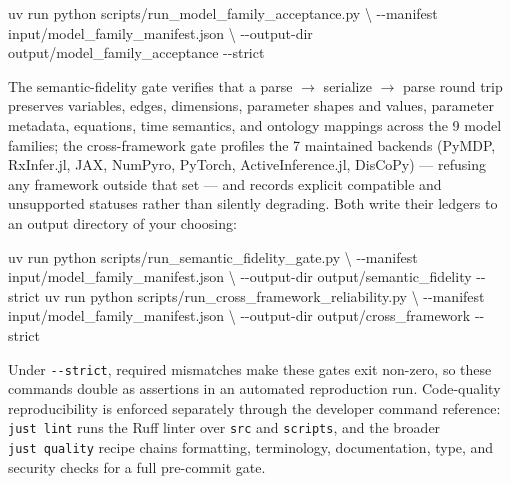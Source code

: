 \documentclass[
  english,
  9pt,
]{extarticle}
\newenvironment{Shaded}{}{}
\newcommand{\AttributeTok}[1]{\textcolor[rgb]{0.49,0.56,0.16}{#1}}
\newcommand{\DataTypeTok}[1]{\textcolor[rgb]{0.56,0.13,0.00}{#1}}
\newcommand{\ExtensionTok}[1]{#1}
\newcommand{\NormalTok}[1]{#1}
\begin{document}
\begin{Shaded}
\begin{Highlighting}[]
\ExtensionTok{uv}\NormalTok{ run python scripts/run\_model\_family\_acceptance.py }\DataTypeTok{\textbackslash{}}
  \AttributeTok{{-}{-}manifest}\NormalTok{ input/model\_family\_manifest.json }\DataTypeTok{\textbackslash{}}
  \AttributeTok{{-}{-}output{-}dir}\NormalTok{ output/model\_family\_acceptance }\AttributeTok{{-}{-}strict}
\end{Highlighting}
\end{Shaded}

The semantic-fidelity gate verifies that a parse \texorpdfstring{\ensuremath{\to}}{->} serialize \texorpdfstring{\ensuremath{\to}}{->} parse
round trip preserves variables, edges, dimensions, parameter shapes and
values, parameter metadata, equations, time semantics, and ontology
mappings across the 9 model families; the cross-framework gate profiles
the 7 maintained backends (PyMDP, RxInfer.jl, JAX, NumPyro, PyTorch,
ActiveInference.jl, DisCoPy) --- refusing any framework outside that set
--- and records explicit compatible and unsupported statuses rather than
silently degrading. Both write their ledgers to an output directory of
your choosing:

\begin{Shaded}
\begin{Highlighting}[]
\ExtensionTok{uv}\NormalTok{ run python scripts/run\_semantic\_fidelity\_gate.py }\DataTypeTok{\textbackslash{}}
  \AttributeTok{{-}{-}manifest}\NormalTok{ input/model\_family\_manifest.json }\DataTypeTok{\textbackslash{}}
  \AttributeTok{{-}{-}output{-}dir}\NormalTok{ output/semantic\_fidelity }\AttributeTok{{-}{-}strict}
\ExtensionTok{uv}\NormalTok{ run python scripts/run\_cross\_framework\_reliability.py }\DataTypeTok{\textbackslash{}}
  \AttributeTok{{-}{-}manifest}\NormalTok{ input/model\_family\_manifest.json }\DataTypeTok{\textbackslash{}}
  \AttributeTok{{-}{-}output{-}dir}\NormalTok{ output/cross\_framework }\AttributeTok{{-}{-}strict}
\end{Highlighting}
\end{Shaded}

Under \texttt{-\/-strict}, required mismatches make these gates exit
non-zero, so these commands double as assertions in an automated
reproduction run. Code-quality reproducibility is enforced separately
through the developer command reference: \texttt{just\ lint} runs the
Ruff linter over \texttt{src} and \texttt{scripts}, and the broader
\texttt{just\ quality} recipe chains formatting, terminology,
documentation, type, and security checks for a full pre-commit gate.
\end{document}
